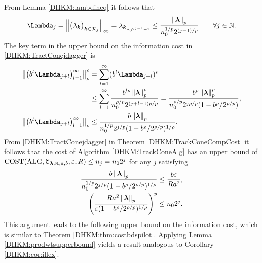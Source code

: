 \documentclass[USenglish]{article}
\theoremstyle{dgthm}
\theoremstyle{dgthm}
\theoremstyle{dgthm}
\theoremstyle{dgthm}
\theoremstyle{dgdef}
\theoremstyle{definition}
\DeclareMathOperator{\DHKMALG}{ALG}
\DeclareMathOperator{\DHKMCOST}{COST}
\newcommand{\norm}[2][{}]{\ensuremath{\left \lVert #2 \right \rVert}_{#1}}
\begin{document}
From Lemma \ref{DHKM:lambdineq} it follows that 
\begin{equation*}
    \Lambda_j = \norm[\infty]{\bigl(\lambda_{\bsk} \bigr)_{\bsk \in \calK_j}} = \lambda_{\bsk_{n_02^{j-1}+1}}\le \frac{\norm[p]{\bslambda}}{n_0^{1/p} 2^{(j-1)/p}} \qquad \forall j \in \bbN.
\end{equation*}
The key term in the upper bound on the information cost in \eqref{DHKM:TractConejdagger} is
\begin{align*}
\norm[\rho]{ \bigl(b^{l}\Lambda_{j+l} \bigr)_{l=1}^\infty}^\rho
 & =  \sum_{l=1}^\infty
( b^{l}\Lambda_{j+l})^\rho \\
& \le \sum_{l=1}^\infty  
 \frac{b^{l\rho} \norm[p]{\bslambda}^\rho }{ n_0^{\rho/p} 2^{(j+l-1)\rho/p}} 
=  
 \frac{b^{\rho} \norm[p]{\bslambda}^\rho }{ n_0^{\rho/p} 2^{j\rho/p} (1 - b^{\rho}/2^{\rho/p})}, \\
\norm[\rho]{ \bigl(b^{l}\Lambda_{j+l} \bigr)_{l=1}^\infty}
 & \le  
 \frac{b \norm[p]{\bslambda} }{ n_0^{1/p} 2^{j/p} (1 - b^{\rho}/2^{\rho/p})^{1/\rho}}.
\end{align*}
From \eqref{DHKM:TractConejdagger} in Theorem \ref{DHKM:TrackConeCompCost} it follows that the cost of Algorithm \ref{DHKM:TrackConeAlg} has an upper bound of $\DHKMCOST(\DHKMALG,\calC_{\bslambda,\bsn,a,b},\varepsilon,R) \le n_j = n_0 2^j$ for any $j$ satisfying 
\begin{align*}
    \frac{b \norm[p]{\bslambda} }{ n_0^{1/p} 2^{j/p} (1 - b^{\rho}/2^{\rho/p})^{1/\rho}} &\le \frac{b\varepsilon}{R a^2}, \\
   \left(\frac{ R a^{2} \norm[p]{\bslambda} }{\varepsilon (1 - b^{\rho}/2^{\rho/p})^{1/\rho}} \right)^p & \le n_0 2^{j}.
\end{align*}
This argument leads to the following upper bound on the information cost, which is similar to Theorem \ref{DHKM:thm:costbdspilot}.  Applying Lemma \ref{DHKM:prodwtsupperbound} yields a result analogous to Corollary \ref{DHKM:cor:illex}.
\end{document}

